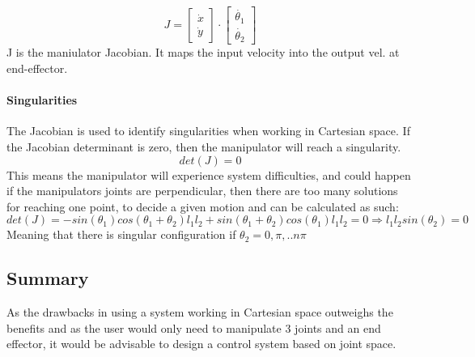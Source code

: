 \begin{equation}\label{eq:Jacobians}
     J=\left[\begin{matrix}
    \Dot{x}\\
    \Dot{y}
\end{matrix}\right]\cdot \left[\begin{matrix}
    \Dot{\theta_1}\\
    \Dot{\theta_2}
\end{matrix}\right]
\end{equation}
\noindent
J is the maniulator Jacobian. It maps the input velocity into the output vel. at
end-effector.

\paragraph*{Singularities}
The Jacobian is used to identify singularities when working in Cartesian space.
If  the Jacobian determinant is zero, then the manipulator will reach a singularity. 
\begin{equation}
    det(J)=0
\end{equation}
This means the manipulator will experience system difficulties, and could happen if the manipulators joints are perpendicular, then there are too many solutions for reaching one point, to decide a given motion and can be calculated as such:\\
\begin{equation}
    det(J)=-sin(\theta_1)cos(\theta_1+\theta_2)l_1l_2+sin(\theta_1+\theta_2)cos(\theta_1)l_1l_2=0 \Rightarrow l_1l_2sin(\theta_2)=0
\end{equation}
\noindent
Meaning that there is singular configuration if $\theta_2=0,\pi,..n\pi$
\subsection*{Summary}
As the drawbacks in using a system working in Cartesian space outweighs the benefits and as the user would only need to manipulate 3 joints and an end effector, it would be advisable to design a control system based on joint space.